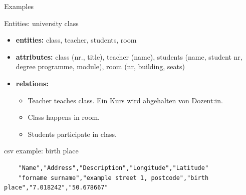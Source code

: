 \begin{frame}[fragile]{Examples}
\begin{block}{Entities: university class}
    \begin{itemize}
        \item \textbf{entities:} class, teacher, students, room 
        \item \textbf{attributes:} class (nr., title), teacher (name), students (name, student nr, degree programme, module), room (nr, building, seats) 
        \item \textbf{relations:}
        \begin{itemize}
            \item Teacher teaches class. Ein Kurs wird abgehalten von Dozent:in.
            \item Class happens in room.
            \item Students participate in class. 
        \end{itemize}
    \end{itemize}
\end{block}

\begin{block}{csv example: birth place}\scriptsize
    \begin{verbatim}
    "Name","Address","Description","Longitude","Latitude"
    "forname surname","example street 1, postcode","birth place","7.018242","50.678667"
    \end{verbatim}
    \end{block}
\end{frame}
